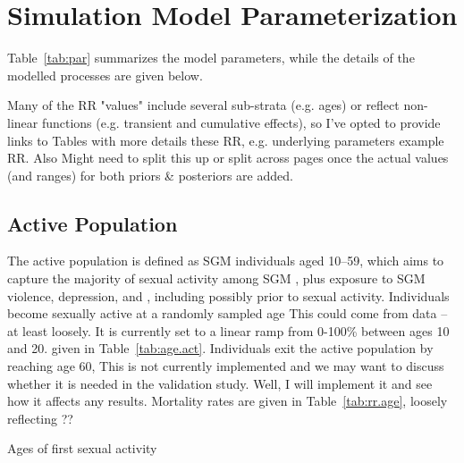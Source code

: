 \section{Simulation Model Parameterization}\label{mod.par}
Table~\ref{tab:par} summarizes the model parameters,
while the details of the modelled processes are given below.
\begin{table}
  \baselineskip
  \caption{
    {Many of the RR "values" include several sub-strata (e.g. ages)
     or reflect non-linear functions (e.g. transient and cumulative effects),
     so I've opted to provide links to Tables with more details these RR,
     e.g. underlying parameters  example RR.
     Also Might need to split this up or split across pages
     once the actual values (and ranges) for both priors \& posteriors are added.}}
  \label{tab:par}
  \centering
\end{table}
\subsection{Active Population}\label{mod.par.act}
The active population is defined as SGM individuals aged 10--59,
which aims to capture the majority of sexual activity among SGM \cite{??},
plus exposure to SGM violence, depression, and \hazdrink,
including possibly prior to sexual activity.
Individuals become sexually active at a randomly sampled age
     {This could come from data -- at least loosely.
      It is currently set to a linear ramp from 0-100\% between ages 10 and 20.}
given in Table~\ref{tab:age.act}.
Individuals exit the active population by reaching age 60,
     {This is not currently implemented
      and we may want to discuss whether it is needed in the validation study.
      Well, I will implement it and see how it affects any results.}
Mortality rates are given in Table~\ref{tab:rr.age},
loosely reflecting ??
\begin{table}
  \caption{Ages of first sexual activity}
  \label{tab:age.act}
  \centering
\end{table}
